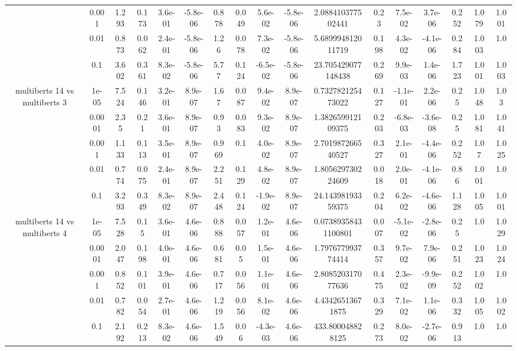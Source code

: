 \begin{tabular}{|c|c|c|c|c|c|c|c|c|c|c|c|c|c|c|c|c|}
 & 0.001 & 1.293 & 0.173 & 3.6e-01 & -5.8e-06 & 0.878 & 0.049 & 5.6e-02 & -5.8e-06 & 2.088410377502441 & 0.23 & 7.5e-02 & 3.7e-06 & 0.252 & 1.079 & 1.001 \\
 & 0.01 & 0.873 & 0.062 & 2.4e-01 & -5.8e-06 & 1.26 & 0.078 & 7.3e-02 & -5.8e-06 & 5.689994812011719 & 0.198 & 4.3e-02 & -4.1e-06 & 0.284 & 1.003 & 1.0 \\
 & 0.1 & 3.602 & 0.361 & 8.3e-02 & -5.8e-06 & 5.77 & 0.124 & -6.5e-02 & -5.8e-06 & 23.705429077148438 & 0.269 & 9.9e-03 & 1.4e-06 & 1.723 & 1.001 & 1.003 \\
\hline
\multirow{5}{*}{multiberts 14 vs multiberts 3} & 1e-05 & 7.524 & 0.146 & 3.2e-01 & 8.9e-07 & 1.67 & 0.087 & 9.4e-02 & 8.9e-07 & 0.732782125473022 & 0.127 & -1.1e-01 & 2.2e-06 & 0.25 & 1.048 & 1.03 \\
 & 0.0001 & 2.35 & 0.21 & 3.6e-01 & 8.9e-07 & 0.93 & 0.083 & 9.3e-02 & 8.9e-07 & 1.382659912109375 & 0.203 & -6.8e-03 & -3.6e-08 & 0.25 & 1.081 & 1.041 \\
 & 0.001 & 1.133 & 0.113 & 3.5e-01 & 8.9e-07 & 0.969 & 0.1 & 4.0e-02 & 8.9e-07 & 2.701987266540527 & 0.327 & 2.1e-01 & -4.4e-06 & 0.252 & 1.07 & 1.025 \\
 & 0.01 & 0.774 & 0.075 & 2.4e-01 & 8.9e-07 & 2.251 & 0.129 & 4.8e-02 & 8.9e-07 & 1.805629730224609 & 0.018 & 2.0e-01 & -4.1e-06 & 0.86 & 1.001 & 1.0 \\
 & 0.1 & 3.293 & 0.349 & 8.3e-02 & 8.9e-07 & 2.448 & 0.124 & -1.9e-02 & 8.9e-07 & 24.14398193359375 & 0.204 & 6.2e-02 & -4.6e-06 & 1.128 & 1.005 & 1.001 \\
\hline
\multirow{5}{*}{multiberts 14 vs multiberts 4} & 1e-05 & 7.528 & 0.15 & 3.6e-01 & 4.6e-06 & 0.888 & 0.057 & 1.2e-01 & 4.6e-06 & 0.07389358431100801 & 0.007 & -5.1e-02 & -2.8e-06 & 0.25 & 1.0 & 1.029 \\
 & 0.0001 & 2.047 & 0.198 & 4.0e-01 & 4.6e-06 & 0.681 & 0.05 & 1.5e-01 & 4.6e-06 & 1.797677993774414 & 0.357 & 9.7e-02 & 7.9e-06 & 0.251 & 1.023 & 1.024 \\
 & 0.001 & 0.852 & 0.101 & 3.9e-01 & 4.6e-06 & 0.717 & 0.056 & 1.1e-01 & 4.6e-06 & 2.808520317077636 & 0.475 & 2.3e-02 & -9.9e-09 & 0.252 & 1.002 & 1.0 \\
 & 0.01 & 0.782 & 0.054 & 2.7e-01 & 4.6e-06 & 1.219 & 0.056 & 8.1e-02 & 4.6e-06 & 4.43426513671875 & 0.329 & 7.1e-02 & 1.1e-06 & 0.332 & 1.005 & 1.002 \\
 & 0.1 & 2.192 & 0.213 & 8.3e-02 & 4.6e-06 & 1.549 & 0.06 & -4.3e-03 & 4.6e-06 & 433.800048828125 & 0.273 & 8.0e-02 & -2.7e-06 & 0.913 & 1.0 & 1.0 \\

\end{tabular}
